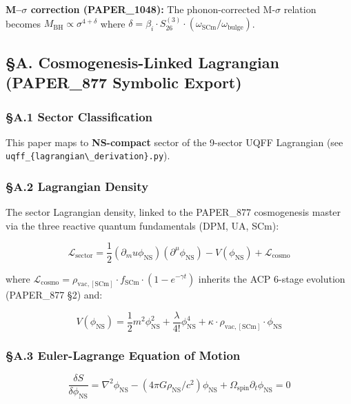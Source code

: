 \textbf{M--\(\sigma\) correction (PAPER\_1048):} The phonon-corrected
M-\(\sigma\) relation becomes
\(M_{\text{BH}} \propto \sigma^{4+\delta}\) where
\(\delta = \beta_i \cdot S_{26}^{(3)} \cdot (\omega_{\text{SCm}}/\omega_{\text{bulge}})\).

\subsection{§A. Cosmogenesis-Linked Lagrangian (PAPER\_877 Symbolic
Export)}\label{a.-cosmogenesis-linked-lagrangian-paper_877-symbolic-export}

\subsubsection{§A.1 Sector
Classification}\label{a.1-sector-classification}

This paper maps to \textbf{NS-compact} sector of the 9-sector UQFF
Lagrangian (see
\texttt{uqff\_\{lagrangian\textbackslash{}\_derivation\}.py}).

\subsubsection{§A.2 Lagrangian Density}\label{a.2-lagrangian-density}

The sector Lagrangian density, linked to the PAPER\_877 cosmogenesis
master via the three reactive quantum fundamentals (DPM, UA, SCm):

\[\mathcal{L}_{\mathrm{sector}} = \frac{1}{2}(\partial_mu \phi_{\mathrm{NS}})(\partial^\mu \phi_{\mathrm{NS}}) - V(\phi_{\mathrm{NS}}) + \mathcal{L}_{\mathrm{cosmo}}\]

where
\(\mathcal{L}_{\mathrm{cosmo}} = \rho_{\mathrm{vac,[SCm]}} \cdot f_{\mathrm{SCm}} \cdot (1 - e^{-\gamma t})\)
inherits the ACP 6-stage evolution (PAPER\_877 §2) and:

\[V(\phi_{\mathrm{NS}}) = \frac{1}{2} m^2 \phi_{\mathrm{NS}}^2 + \frac{\lambda}{4!} \phi_{\mathrm{NS}}^4 + \kappa \cdot \rho_{\mathrm{vac,[SCm]}} \cdot \phi_{\mathrm{NS}}\]

\subsubsection{§A.3 Euler-Lagrange Equation of
Motion}\label{a.3-euler-lagrange-equation-of-motion}

\[\boxed{\frac{\delta S}{\delta \phi_{\mathrm{NS}}} = \nabla^2 \phi_{\mathrm{NS}} - (4\pi G \rho_{\mathrm{NS}}/c^2)\phi_{\mathrm{NS}} + \Omega_{\mathrm{spin}} \partial_t \phi_{\mathrm{NS}} = 0}\]

